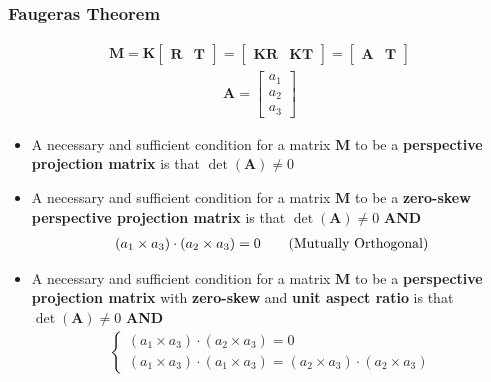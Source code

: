 \documentclass[letterpaper,12pt]{article}
\newcommand{\vect}[1]{\mathbf{#1}}
\newcommand{\matr}[1]{\mathbf{#1}}
\begin{document}
\subsubsection{Faugeras Theorem}
\begin{align}
 \matr{M} = \matr{K} \begin{bmatrix}
  \matr{R} & \vect{T}
 \end{bmatrix}
 = \begin{bmatrix}
  \matr{K}\matr{R} & \matr{K}\vect{T}
 \end{bmatrix}
 = \begin{bmatrix}
  \matr{A} & \vect{T}
 \end{bmatrix}
\end{align}
\begin{align}
 \matr{A} = \begin{bmatrix}
  a_1 \\
  a_2 \\
  a_3
 \end{bmatrix}
\end{align}
\begin{itemize}
 \item A necessary and sufficient condition for a matrix $\matr{M}$ to be a \textbf{perspective projection matrix} is that $\det(\matr{A}) \neq 0$
 \item A necessary and sufficient condition for a matrix $\matr{M}$ to be a \textbf{zero-skew perspective projection matrix} is that $\det(\matr{A}) \neq 0$ \textbf{AND}
       \begin{align}
        (a_1 \times a_3) \cdot (a_2 \times a_3) = 0 \tag{\text{Mutually Orthogonal}}
       \end{align}
 \item A necessary and sufficient condition for a matrix $\matr{M}$ to be a \textbf{perspective projection matrix} with \textbf{zero-skew} and \textbf{unit aspect ratio} is that $\det(\matr{A}) \neq 0$ \textbf{AND}
       \begin{align}
        \begin{cases}
         (a_1 \times a_3) \cdot (a_2 \times a_3) = 0 \\
         (a_1 \times a_3) \cdot (a_1 \times a_3) = (a_2 \times a_3) \cdot (a_2 \times a_3)
        \end{cases}
       \end{align}
\end{itemize}
\end{document}
